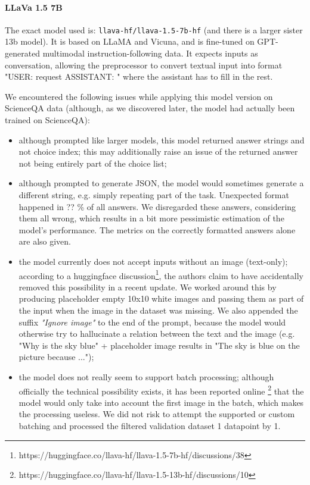 \documentclass{article}
\begin{document}
\paragraph{LLaVa 1.5 7B} The exact model used is: \texttt{llava-hf/llava-1.5-7b-hf} (and there is a larger sister 13b model). It is based on LLaMA and Vicuna, and is fine-tuned on GPT-generated multimodal instruction-following data. It expects inputs as conversation, allowing the preprocessor to convert textual input into format "USER: {request} ASSISTANT: " where the assistant has to fill in the rest. 

We encountered the following issues while applying this model version on ScienceQA data (although, as we discovered later, the model had actually been trained on ScienceQA): 
\begin{itemize}
	\item although prompted like larger models, this model returned answer strings and not choice index; this may additionally raise an issue of the returned answer not being entirely part of the choice list;
	\item although prompted to generate JSON, the model would sometimes generate a different string, e.g. simply repeating part of the task. Unexpected format happened in ?? \% of all answers. We disregarded these answers, considering them all wrong, which results in a bit more pessimistic estimation of the model's performance. The metrics on the correctly formatted answers alone are also given. 
	\item the model currently does not accept inputs without an image (text-only); according to a huggingface discussion\footnote{https://huggingface.co/llava-hf/llava-1.5-7b-hf/discussions/38}, the authors claim to have accidentally removed this possibility in a recent update. We worked around this by producing placeholder empty 10x10 white images and passing them as part of the input when the image in the dataset was missing. We also appended the suffix \textit{"Ignore image"} to the end of the prompt, because the model would otherwise try to hallucinate a relation between the text and the image (e.g. "Why is the sky blue" + placeholder image results in "The sky is blue on the picture because ...");
	\item the model does not really seem to support batch processing; although officially the technical possibility exists, it has been reported online \footnote{https://huggingface.co/llava-hf/llava-1.5-13b-hf/discussions/10} that the model would only take into account the first image in the batch, which makes the processing useless. We did not risk to attempt the supported or custom batching and processed the filtered validation dataset 1 datapoint by 1. 
\end{itemize}
\end{document}
